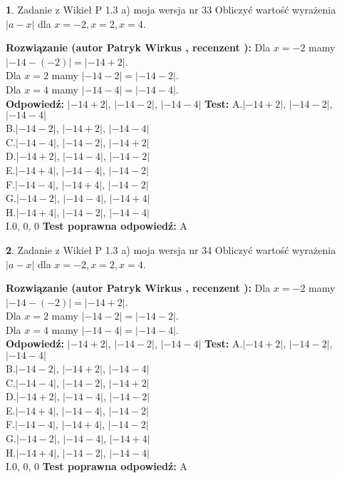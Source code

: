 \documentclass[12pt, a4paper]{article}
\theoremstyle{definition} %
\newtheorem{zad}{}
\newcommand{\zadStart}[1]{\begin{zad}#1\newline}
\newcommand{\zadStop}{\end{zad}}
\newcommand{\rozwStart}[2]{\noindent \textbf{Rozwiązanie (autor #1 , recenzent #2): }\newline}
\newcommand{\rozwStop}{\newline}
\newcommand{\odpStart}{\noindent \textbf{Odpowiedź:}\newline}
\newcommand{\odpStop}{\newline}
\newcommand{\testStart}{\noindent \textbf{Test:}\newline}
\newcommand{\testStop}{\newline}
\newcommand{\kluczStart}{\noindent \textbf{Test poprawna odpowiedź:}\newline}
\newcommand{\kluczStop}{\newline}
\begin{document}
\zadStart{Zadanie z Wikieł P 1.3 a) moja wersja nr 33}
Obliczyć wartość wyrażenia $|a - x|$ dla $x=-2,x=2,x=4$.
\zadStop
\rozwStart{Patryk Wirkus}{}
Dla $x = -2$ mamy $|-14 - (-2)| = |-14 + 2|$.\\
Dla $x = 2$ mamy $|-14 - 2| = |-14 - 2|$.\\
Dla $x = 4$ mamy $|-14 - 4| = |-14 - 4|$.\\
\rozwStop
\odpStart
$|-14 + 2|$, $|-14 - 2|$, $|-14 - 4|$
\odpStop
\testStart
A.$|-14 + 2|$, $|-14 - 2|$, $|-14 - 4|$\\
B.$|-14 - 2|$, $|-14 + 2|$, $|-14 - 4|$\\
C.$|-14 - 4|$, $|-14 - 2|$, $|-14 + 2|$\\
D.$|-14 + 2|$, $|-14 - 4|$, $|-14 - 2|$\\
E.$|-14 + 4|$, $|-14 - 4|$, $|-14 - 2|$\\
F.$|-14 - 4|$, $|-14 + 4|$, $|-14 - 2|$\\
G.$|-14 - 2|$, $|-14 - 4|$, $|-14 + 4|$\\
H.$|-14 + 4|$, $|-14 - 2|$, $|-14 - 4|$\\
I.$0$, $0$, $0$
\testStop
\kluczStart
A
\kluczStop



\zadStart{Zadanie z Wikieł P 1.3 a) moja wersja nr 34}
Obliczyć wartość wyrażenia $|a - x|$ dla $x=-2,x=2,x=4$.
\zadStop
\rozwStart{Patryk Wirkus}{}
Dla $x = -2$ mamy $|-14 - (-2)| = |-14 + 2|$.\\
Dla $x = 2$ mamy $|-14 - 2| = |-14 - 2|$.\\
Dla $x = 4$ mamy $|-14 - 4| = |-14 - 4|$.\\
\rozwStop
\odpStart
$|-14 + 2|$, $|-14 - 2|$, $|-14 - 4|$
\odpStop
\testStart
A.$|-14 + 2|$, $|-14 - 2|$, $|-14 - 4|$\\
B.$|-14 - 2|$, $|-14 + 2|$, $|-14 - 4|$\\
C.$|-14 - 4|$, $|-14 - 2|$, $|-14 + 2|$\\
D.$|-14 + 2|$, $|-14 - 4|$, $|-14 - 2|$\\
E.$|-14 + 4|$, $|-14 - 4|$, $|-14 - 2|$\\
F.$|-14 - 4|$, $|-14 + 4|$, $|-14 - 2|$\\
G.$|-14 - 2|$, $|-14 - 4|$, $|-14 + 4|$\\
H.$|-14 + 4|$, $|-14 - 2|$, $|-14 - 4|$\\
I.$0$, $0$, $0$
\testStop
\kluczStart
A
\kluczStop
\end{document}
